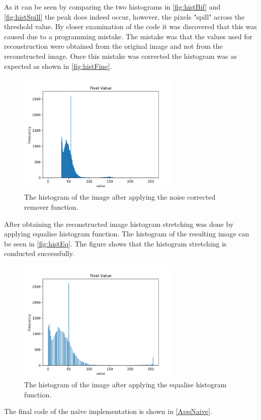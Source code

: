 \noindent
As it can be seen by comparing the two histograms in \autoref{fig:histBif} and \autoref{fig:histSpill} the peak does indeed occur, however, the pixels "spill" across the threshold value. By closer examination of the code it was discovered that this was caused due to a programming mistake. The mistake was that the values used for reconstruction were obtained from the original image and not from the reconstructed image. Once this mistake was corrected the histogram was as expected as shown in \autoref{fig:histFine}. 

\begin{figure}[h]
\centering
\includegraphics[width=0.7\textwidth]{figures/hist_nicespacing.png}
\caption{The histogram of the image after applying the noise corrected remover function.}
\label{fig:histFine}
\end{figure}

\noindent
After obtaining the reconstructed image histogram stretching was done by applying equalise histogram function. The histogram of the resulting image can be seen in \autoref{fig:histEq}. The figure shows that the histogram stretching is conducted successfully. 

\begin{figure}[h]
\centering
\includegraphics[width=0.7\textwidth]{figures/hist_equal.png}
\caption{The histogram of the image after applying the equalise histogram function.}
\label{fig:histEq}
\end{figure}

\noindent
The final code of the na\"ive implementation is shown in \autoref{AppNaive}.
